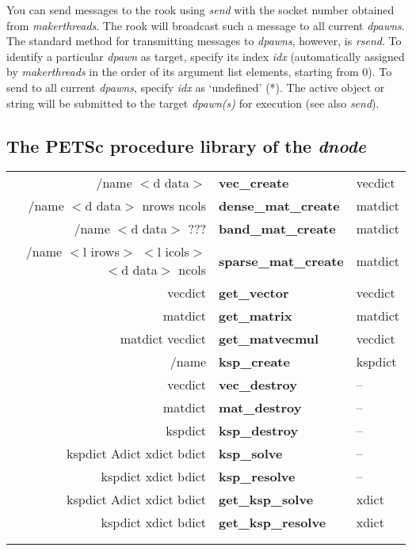 You can send messages to the rook using \emph{send} with the socket number obtained from \emph{makerthreads}. The rook will broadcast such a message to all current \emph{dpawns}. The standard method for transmitting messages to \emph{dpawns}, however, is \emph{rsend}. To identify a particular \emph{dpawn} as target, specify its index \emph{idx} (automatically assigned by \emph{makerthreads} in the order of its argument list elements, starting from 0). To send to all current \emph{dpawns}, specify \emph{idx} as `undefined' (*). The active object or string will be submitted to the target \emph{dpawn(s)} for execution (see also \emph{send}).

\subsection{The PETSc procedure library of the \emph{dnode}}

\begin{tabular}{>{\sffamily}r>{\sffamily\bfseries}l>{\sffamily}l}
/name $<$d data$>$ & vec\_create & vecdict \\
/name $<$d data$>$ nrows ncols & dense\_mat\_create & matdict \\
/name $<$d data$>$ ??? & band\_mat\_create & matdict \\
/name $<$l irows$>$ $<$l icols$>$ $<$d data$>$ ncols & sparse\_mat\_create & matdict \\
vecdict & get\_vector & vecdict\\
matdict & get\_matrix & matdict\\
matdict vecdict & get\_matvecmul & vecdict\\
/name & ksp\_create & kspdict\\
vecdict & vec\_destroy & --\\
matdict & mat\_destroy & -- \\
kspdict & ksp\_destroy & --\\
kspdict Adict xdict bdict & ksp\_solve & --\\
kspdict xdict bdict & ksp\_resolve & --\\
kspdict Adict xdict bdict & get\_ksp\_solve & xdict\\
kspdict xdict bdict & get\_ksp\_resolve & xdict\\
\\\\
\end{tabular}


